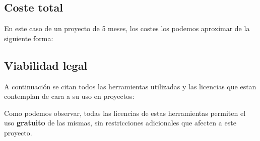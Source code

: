 \subsection{Coste total}
En este caso de un proyecto de 5 meses, los costes los podemos aproximar de la siguiente forma:

\subsection{Viabilidad legal}
A continuación se citan todos las herramientas utilizadas y las licencias que estan contemplan de cara a su uso en proyectos:


Como podemos observar, todas las licencias de estas herramientas permiten el uso \textbf{gratuito} de las mismas, sin restricciones adicionales que afecten a este proyecto.